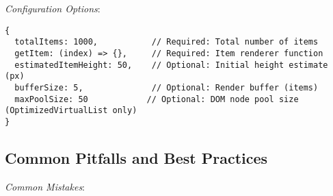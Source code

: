 \documentclass[11pt]{article}
\begin{document}
\emph{Configuration Options}:

\begin{verbatim}
{
  totalItems: 1000,           // Required: Total number of items
  getItem: (index) => {},     // Required: Item renderer function
  estimatedItemHeight: 50,    // Optional: Initial height estimate (px)
  bufferSize: 5,              // Optional: Render buffer (items)
  maxPoolSize: 50            // Optional: DOM node pool size (OptimizedVirtualList only)
}
\end{verbatim}
\subsection{Common Pitfalls and Best Practices}
\label{sec:orgbfcbb01}

\emph{Common Mistakes}:
\end{document}
